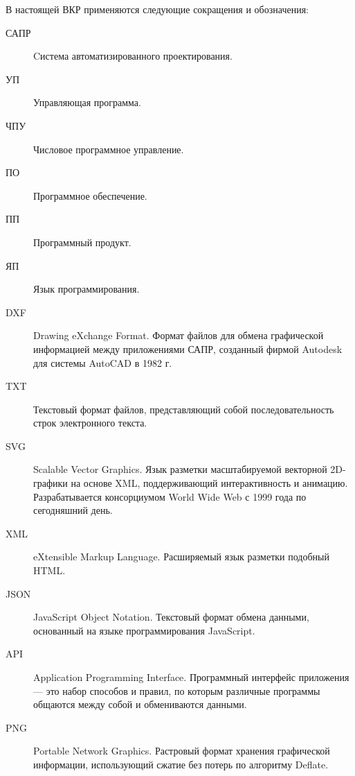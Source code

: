 \Abbreviations %

В настоящей ВКР применяются следующие сокращения и обозначения:

\begin{description}
	
\item[САПР] Cистема автоматизированного проектирования.

\item[УП] Управляющая программа.

\item[ЧПУ] Числовое программное управление.

\item[ПО] Программное обеспечение.

\item[ПП] Программный продукт.

\item[ЯП] Язык программирования.

\item[DXF] Drawing eXchange Format. Формат файлов для обмена графической информацией между приложениями САПР, созданный фирмой Autodesk для системы AutoCAD в 1982 г.

\item[TXT] Текстовый формат файлов, представляющий собой последовательность строк электронного текста.

\item[SVG] Scalable Vector Graphics. Язык разметки масштабируемой векторной 2D-графики на основе XML, поддерживающий интерактивность и анимацию. Разрабатывается консорциумом World Wide Web с 1999 года по сегодняшний день.

\item[XML] eXtensible Markup Language. Расширяемый язык разметки подобный HTML.

\item[JSON] JavaScript Object Notation. Текстовый формат обмена данными, основанный на языке программирования JavaScript.

\item[API] Application Programming Interface. Программный интерфейс приложения --- это набор способов и правил, по которым различные программы общаются между собой и обмениваются данными.

\item[PNG] Portable Network Graphics. Растровый формат хранения графической информации, использующий сжатие без потерь по алгоритму Deflate.

\end{description}

